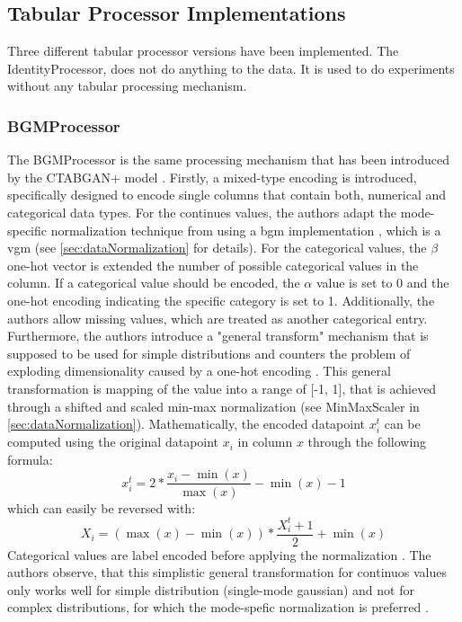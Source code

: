 \subsection[]{Tabular Processor Implementations}
\label{ch:architecture-tabularProcessor-implementations}

Three different tabular processor versions have been implemented.
The IdentityProcessor, does not do anything to the data.
It is used to do experiments without any tabular processing mechanism.

\subsubsection*{BGMProcessor}
\label{ch:BGMProcessor}

The BGMProcessor is the same processing mechanism that has been introduced by the CTABGAN+ model \cite{zhao2022CTABGANEnhancingTabular}.
Firstly, a mixed-type encoding is introduced, specifically designed to encode single columns that contain both, numerical and categorical data types.
For the continues values, the authors adapt the mode-specific normalization technique from \cite{xu2019ModelingTabularData} using a \gls{bgm} implementation \cite{BayesianGaussianMixture}, which is a \gls{vgm} (see \autoref{sec:dataNormalization} for details).
For the categorical values, the $\beta$ one-hot vector is extended the number of possible categorical values in the column.
If a categorical value should be encoded, the $\alpha$ value is set to 0 and the one-hot encoding indicating the specific category is set to 1.
Additionally, the authors allow missing values, which are treated as another categorical entry.
Furthermore, the authors introduce a "general transform" mechanism \cite[p. 7]{zhao2022CTABGANEnhancingTabular} that is supposed to be used for simple distributions and counters the problem of exploding dimensionality caused by a one-hot encoding \cite{zhao2022CTABGANEnhancingTabular}.
This general transformation is mapping of the value into a range of  [-1, 1], that is achieved through a shifted and scaled min-max normalization (see MinMaxScaler in \autoref{sec:dataNormalization}).
Mathematically, the encoded datapoint $x^t_i$ can be computed using the original datapoint $x_i$ in column $x$ through the following formula:
$$x^t_i=2* \frac{x_i-\min(x)}{\max(x)}-\min(x)-1$$ 
which can easily be reversed with:
$$X_i = (\max(x)-\min(x))*\frac{X^t_i+1}{2}+\min(x)$$
Categorical values are label encoded before applying the normalization \cite{zhao2022CTABGANEnhancingTabular}.
The authors observe, that this simplistic general transformation for continuos values only works well for simple distribution (\eg single-mode gaussian) and not for complex distributions, for which the mode-spefic normalization is preferred \cite{zhao2022CTABGANEnhancingTabular}.
